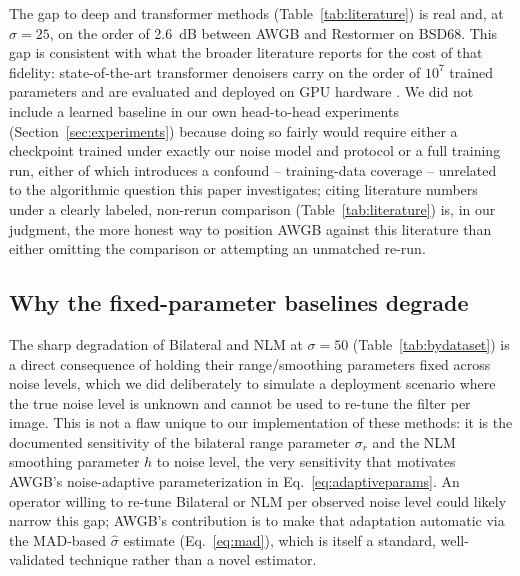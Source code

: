 \documentclass[final,3p,times,twocolumn,nopreprintline]{elsarticle}
\begin{document}
The gap to deep and transformer methods (Table~\ref{tab:literature}) is real and, at $\sigma=25$, on the order of 2.6~dB between AWGB and Restormer on BSD68. This gap is consistent with what the broader literature reports for the cost of that fidelity: state-of-the-art transformer denoisers carry on the order of $10^7$ trained parameters and are evaluated and deployed on GPU hardware \cite{zamir2022restormer,liang2021swinir}. We did not include a learned baseline in our own head-to-head experiments (Section~\ref{sec:experiments}) because doing so fairly would require either a checkpoint trained under exactly our noise model and protocol or a full training run, either of which introduces a confound -- training-data coverage -- unrelated to the algorithmic question this paper investigates; citing literature numbers under a clearly labeled, non-rerun comparison (Table~\ref{tab:literature}) is, in our judgment, the more honest way to position AWGB against this literature than either omitting the comparison or attempting an unmatched re-run.

\subsection{Why the fixed-parameter baselines degrade}
The sharp degradation of Bilateral and NLM at $\sigma=50$ (Table~\ref{tab:bydataset}) is a direct consequence of holding their range/smoothing parameters fixed across noise levels, which we did deliberately to simulate a deployment scenario where the true noise level is unknown and cannot be used to re-tune the filter per image. This is not a flaw unique to our implementation of these methods: it is the documented sensitivity of the bilateral range parameter $\sigma_r$ \cite{tomasi1998bilateral} and the NLM smoothing parameter $h$ \cite{buades2005non} to noise level, the very sensitivity that motivates AWGB's noise-adaptive parameterization in Eq.~\eqref{eq:adaptiveparams}. An operator willing to re-tune Bilateral or NLM per observed noise level could likely narrow this gap; AWGB's contribution is to make that adaptation automatic via the MAD-based $\hat\sigma$ estimate (Eq.~\eqref{eq:mad}), which is itself a standard, well-validated technique \cite{donoho1995noising} rather than a novel estimator.
\end{document}
